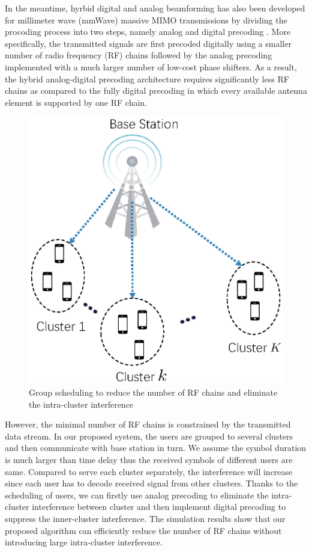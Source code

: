 \documentclass[conference]{IEEEtran}
\begin{document}
In the meantime, hyrbid digital and analog beamforming has also been developed for millimeter wave (mmWave) massive MIMO transmissions by dividing the procoding process into two steps, namely analog and digital precoding \cite{han2015large, el2014spatially}. More specifically, the transmitted signals are first precoded digitally using a smaller number of radio frequency (RF) chains followed by the analog precoding implemented with a much larger number of low-cost phase shifters. As a result, the hybrid analog-digital precoding architecture requires significantly less RF chains as compared to the fully digital precoding in which every available antenna element is supported by one RF chain. 

\begin{figure}[h]
	\begin{center}
		\includegraphics[scale=0.55]{PPTFigure/groupcluster.eps}
		\caption{Group scheduling to reduce the number of RF chains and eliminate the intra-cluster interference}\label{fig:BDMA}
	\end{center}
\end{figure}

{\color{red}However, the minimal number of RF chains is constrained by the transmitted data stream. In our proposed system, the users are grouped to several clusters and then communicate with base station in turn. We assume the symbol duration is much larger than time delay thus the received symbols of different users are same. Compared to serve each cluster separately, the interference will increase since each user has to decode received signal from other clusters. Thanks to the scheduling of users, we can firstly use analog precoding to eliminate the intra-cluster interference between cluster and then implement digital precoding to suppress the inner-cluster interference. The simulation results show that our proposed algorithm can efficiently reduce the number of RF chains without introducing large intra-cluster interference.} 
\end{document}
